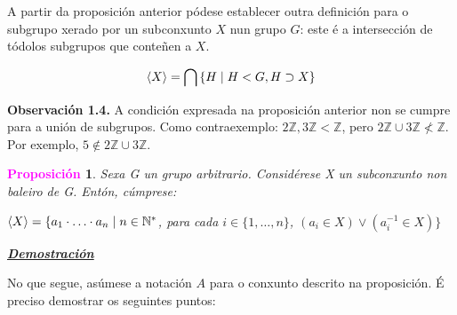 \documentclass[twoside]{report}
\newcommand{\magbf}[1]{\textcolor{magenta}{\textbf{#1}}} %
\theoremstyle{mystyle}
\newtheorem{prop}{\magbf{Proposición}}[chapter]
\newenvironment{proposition}
{\begin{mdframed}[linecolor = magenta,backgroundcolor = classicrose, linewidth = 2mm]\begin{prop}}
{\end{prop}\end{mdframed}}
\begin{document}
\vspace{3mm}

\noindent A partir da proposición anterior pódese establecer outra definición para o subgrupo xerado por un subconxunto $X$ nun grupo $G$: este é a intersección de tódolos subgrupos que conteñen a $X$.


    $$\langle X \rangle = \bigcap{ \{H \hspace{1MM} | \hspace{1MM} H < G, H \supset X\} } $$


\vspace{3mm}

\noindent \textbf{Observación 1.4.} A condición expresada na proposición anterior non se cumpre para a unión de subgrupos. Como contraexemplo: $2\mathbb{Z}, 3\mathbb{Z} < \mathbb{Z}$, pero $2\mathbb{Z} \cup 3\mathbb{Z} \nless \mathbb{Z}$. Por exemplo, $5 \notin 2\mathbb{Z} \cup 3\mathbb{Z}$.

\vspace{3mm}

\begin{proposition} \label{prop1.2}
Sexa G un grupo arbitrario. Considérese X un subconxunto non baleiro de G. Entón, cúmprese:
\begin{center}
    $\langle X \rangle = \{a_{1} \cdot \ldots \cdot a_{n} \hspace{1mm} | \hspace{1mm} n \in \mathbb{N^{*}}$, para cada $i \in \{1, \dots, n\}$, $(a_{i} \in X) \lor (a_{i}^{-1} \in X) \}$
\end{center}
\end{proposition}

\vspace{2mm}

\noindent \textbf{\textit{\underline{Demostración}}}

\vspace{2mm}

\noindent No que segue, asúmese a notación $A$ para o conxunto descrito na proposición. É preciso demostrar os seguintes puntos:
\end{document}
